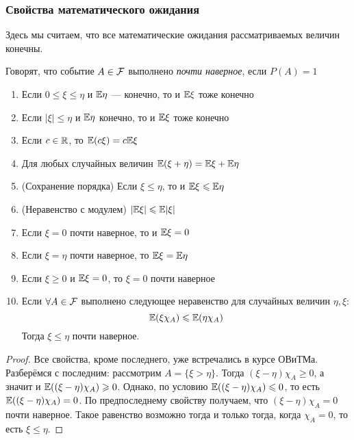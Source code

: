 \subsubsection*{Свойства математического ожидания}

\begin{note}
	Здесь мы считаем, что все математические ожидания рассматриваемых величин конечны.
\end{note}

\begin{definition}
	Говорят, что событие $A \in \mathcal{F}$ выполнено \textit{почти наверное}, если $P(A) = 1$
\end{definition}

\begin{enumerate}
	\item Если $0 \le \xi \le \eta$ и $\mathbb{E}\eta$ --- конечно, то и $\mathbb{E}\xi$ тоже конечно
	
	\item Если $|\xi| \le \eta$ и $\mathbb{E}\eta$ конечно, то и $\mathbb{E}\xi$ тоже конечно
	
	\item Если $c \in \mathbb{R}$, то $\mathbb{E}(c\xi) = c\mathbb{E}\xi$
	
	\item Для любых случайных величин $\mathbb{E}(\xi + \eta) = \mathbb{E}\xi + \mathbb{E}\eta$
	
	\item (Сохранение порядка) Если $\xi \le \eta$, то и $\mathbb{E}\xi \leqslant \mathbb{E}\eta$
	
	\item (Неравенство с модулем) $|\mathbb{E}\xi| \leqslant \mathbb{E}|\xi|$
	
	\item Если $\xi = 0$ почти наверное, то и $\mathbb{E}\xi = 0$
	
	\item Если $\xi = \eta$ почти наверное, то $\mathbb{E}\xi = \mathbb{E}\eta$
	
	\item Если $\xi \ge 0$ и $\mathbb{E}\xi = 0$, то $\xi = 0$ почти наверное
	
	\item Если $\forall A \in \mathcal{F}$ выполнено следующее неравенство для случайных величин $\eta, \xi$:
	\[
		\mathbb{E}(\xi\chi_A) \leqslant \mathbb{E}(\eta\chi_A)
	\]
	Тогда $\xi \le \eta$ почти наверное.
\end{enumerate}

\begin{proof}
	Все свойства, кроме последнего, уже встречались в курсе ОВиТМа. Разберёмся с последним: рассмотрим $A = \{\xi > \eta\}$. Тогда $(\xi - \eta)\chi_A \ge 0$, а значит и $\mathbb{E}((\xi - \eta)\chi_A) \geqslant 0$. Однако, по условию $\mathbb{E}((\xi - \eta)\chi_A) \leqslant 0$, то есть $\mathbb{E}((\xi - \eta)\chi_A) = 0$. По предпоследнему свойству получаем, что $(\xi - \eta)\chi_A = 0$ почти наверное. Такое равенство возможно тогда и только тогда, когда $\chi_A = 0$, то есть $\xi \le \eta$.
\end{proof}

